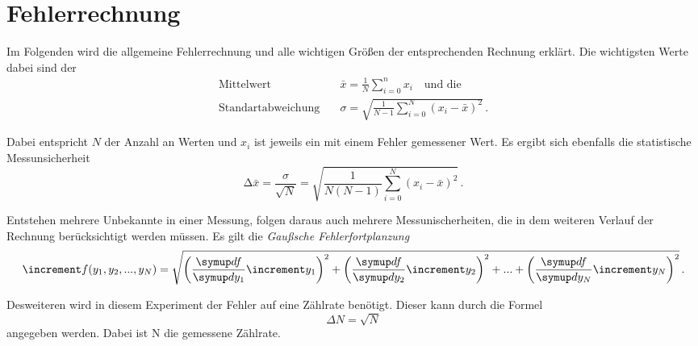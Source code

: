 \section{Fehlerrechnung}
\label{sec:Fehlerrechnung}

Im Folgenden wird die allgemeine Fehlerrechnung und alle wichtigen Größen der entsprechenden Rechnung erklärt.
Die wichtigsten Werte dabei sind der 
\begin{align}
    \text{Mittelwert} \quad & \bar{x}  = \frac{1}{N} \sum_{i=0}^{n} x_i \quad \text{und die} \label{eq:mittelwert} \\
    \text{Standartabweichung} \quad & \sigma  = \sqrt{\frac{1}{N - 1 } \sum_{i=0}^{N} (x_i -  \bar{x})^2} \, . \label{eq:standartabweichung}
\end{align}

Dabei entspricht $N$ der Anzahl an Werten und $x_i$ ist jeweils ein mit einem Fehler gemessener Wert.
Es ergibt sich ebenfalls die statistische Messunsicherheit
\begin{equation}
    \increment \bar{x} = \frac{\sigma}{\sqrt{N}} = 
    \sqrt{\frac{1}{N(N - 1)} \sum_{i=0}^{N} (x_i -  \bar{x})^2} \, . \label{eq:messunsicherheit}
\end{equation} 

Entstehen mehrere Unbekannte in einer Messung, folgen daraus auch mehrere Messunischerheiten,
die in dem weiteren Verlauf der Rechnung berücksichtigt werden müssen.
Es gilt die \textit{Gaußsche Fehlerfortplanzung}
\begin{equation}
    \increment f(y_1 ,y_2 ,...,y_N ) = \sqrt{\left(\frac{\dif{f}}{\dif{y_{1}}} \increment y_{1}\right)^2
    + \left(\frac{\dif{f}}{\dif{y_{2}}} \increment y_{2}\right)^2 + ... + 
    \left(\frac{\dif{f}}{\dif{y_{N}}} \increment y_{N}\right)^2
    } \, . \label{eq:fehlerfortplanzung}
\end{equation}

Desweiteren wird in diesem Experiment der Fehler auf eine Zählrate benötigt.
Dieser kann durch die Formel
\begin{equation}
    \Delta N = \sqrt{N}
\end{equation}
angegeben werden. Dabei ist N die gemessene Zählrate.